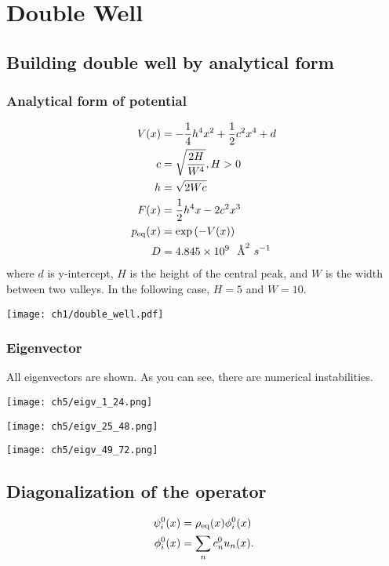\chapter{Double Well}
\section{Building double well by analytical form}
\subsection{Analytical form of potential}
\begin{align}
        V(x) &= -\frac{1}{4} h^4 x^2 + \frac{1}{2} c^2 x^4 + d\\
        c    &= \sqrt{\frac{2H}{W^4}},H > 0 \\
        h    &= \sqrt{2Wc} \\
        F(x) &= \frac{1}{2} h^4 x - 2 c^2 x^3\\
        p_{\rm eq}(x) &= \exp{(-V(x))} \\
        D &= 4.845 \times 10^{9}~~\text{\AA}^2~s^{-1}\\
\end{align}
where $d$ is y-intercept, $H$ is the height of the central peak, and $W$ is the width between two valleys. In the following case, $H=5$ and $W=10$.
\begin{center}
        \texttt{[image: ch1/double\_well.pdf]} 
\end{center}
\subsection{Eigenvector}
All eigenvectors are shown. As you can see, there are numerical instabilities.
\begin{center}
        \texttt{[image: ch5/eigv\_1\_24.png]} 
\end{center}
\begin{center}
        \texttt{[image: ch5/eigv\_25\_48.png]} 
\end{center}
\begin{center}
        \texttt{[image: ch5/eigv\_49\_72.png]} 
\end{center}

\section{Diagonalization of the operator}
\begin{definition}
\begin{align}
        \psi^0_i(x) &= \rho_{\rm eq}(x) \phi^0_i(x) \\
        \phi^0_i(x) &= \sum_n c^0_n u_n(x).
\end{align}
\label{basisfunctions}
\end{definition}

